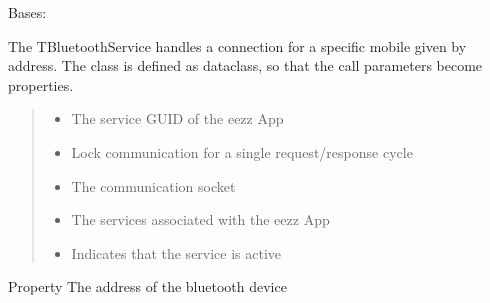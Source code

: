 \documentclass[letterpaper,10pt,english]{sphinxmanual}
\begin{document}
\begin{savenotes}\begin{fulllineitems}
\label{\detokenize{eezz:eezz.blueserv.TBluetoothService}}
\pysigstartsignatures
{}
\pysigstopsignatures
\sphinxAtStartPar
Bases: 

\sphinxAtStartPar
The TBluetoothService handles a connection for a specific mobile given by address.
The class is defined as dataclass, so that the call parameters become properties.
\begin{quote}\begin{description}
\begin{itemize}
\item {} 
\sphinxAtStartPar
{} \textendash{} The service GUID of the eezz App

\item {} 
\sphinxAtStartPar
{} \textendash{} Lock communication for a single request/response cycle

\item {} 
\sphinxAtStartPar
{} \textendash{} The communication socket

\item {} 
\sphinxAtStartPar
{} \textendash{} The services associated with the eezz App

\item {} 
\sphinxAtStartPar
{} \textendash{} Indicates that the service is active

\end{itemize}

\end{description}\end{quote}

\begin{savenotes}\begin{fulllineitems}
\label{\detokenize{eezz:eezz.blueserv.TBluetoothService.address}}
\pysigstartsignatures
{}
\pysigstopsignatures
\sphinxAtStartPar
Property \sphinxhyphen{} The address of the bluetooth device


\end{fulllineitems}
\end{savenotes}
\end{fulllineitems}
\end{savenotes}
\end{document}
